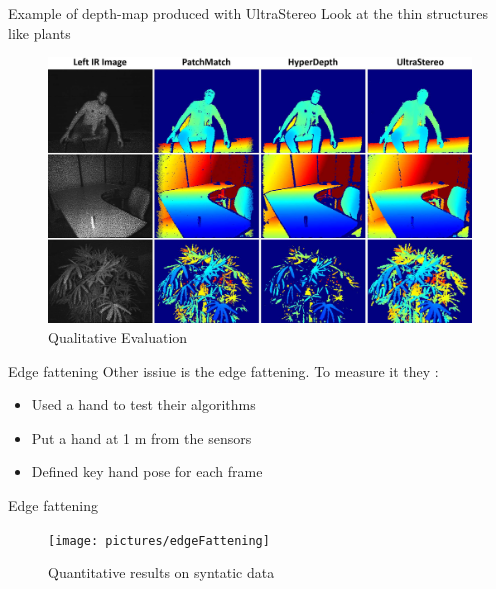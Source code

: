 \begin{frame}{Example of depth-map produced with UltraStereo}
Look at the thin structures like plants
\begin{figure}
\includegraphics[scale=0.08]{pictures/fig5}
\caption{Qualitative Evaluation}
\end{figure}
\end{frame}

\begin{frame}{Edge fattening}
Other issiue is the edge fattening. To measure it they :
\begin{itemize}
\item Used a hand to test their algorithms
\item Put a hand at 1 m from the sensors
\item Defined key hand pose for each frame
\end{itemize}
\end{frame}

\begin{frame}{Edge fattening}

\begin{figure}
\texttt{[image: pictures/edgeFattening]}
\caption{Quantitative results on syntatic data}
\end{figure}
\end{frame}

